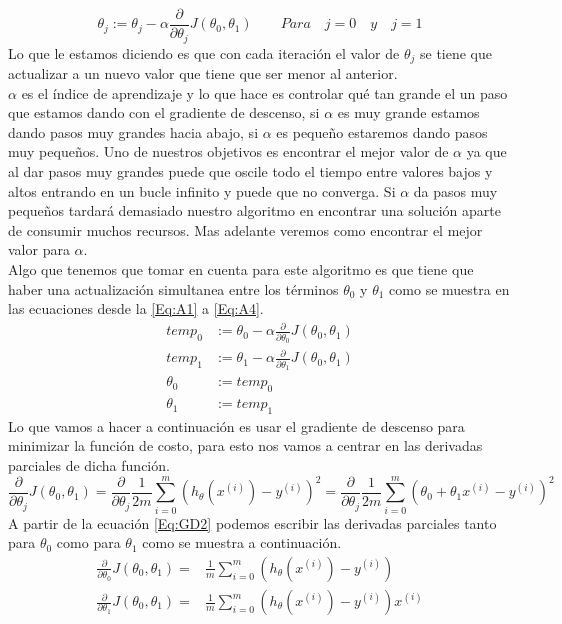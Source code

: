 \documentclass{book}
\begin{document}
\begin{equation}
	\theta_j := \theta_j -\alpha\frac{\partial}{\partial\theta_j}J(\theta_0,\theta_1)\qquad Para\quad j=0\quad y\quad j=1
	\label{Eq:DG}
\end{equation}
Lo que le estamos diciendo es que con cada iteración el valor de $\theta_j$ se tiene que actualizar a un nuevo valor que tiene que ser menor al anterior.\\$\alpha$ es el índice de aprendizaje y lo que hace es controlar qué tan grande el un paso que estamos dando con el gradiente de descenso, si $\alpha$ es muy grande estamos dando pasos muy grandes hacia abajo, si $\alpha$ es pequeño estaremos dando pasos muy pequeños. Uno de nuestros objetivos es encontrar el mejor valor de $\alpha$ ya que al dar pasos muy grandes puede que oscile todo el tiempo entre valores bajos y altos entrando en un bucle infinito y puede que no converga. Si $\alpha$ da pasos muy pequeños tardará demasiado nuestro algoritmo en encontrar una solución aparte de consumir muchos recursos. Mas adelante veremos como encontrar el mejor valor para $\alpha$.\\Algo que tenemos que tomar en cuenta para este algoritmo es que tiene que haber una actualización simultanea entre los términos $\theta_0$ y $\theta_1$ como se muestra en las ecuaciones desde la \ref{Eq:A1} a \ref{Eq:A4}.
\begin{align}
	temp_0&:= \theta_0 -\alpha\frac{\partial}{\partial\theta_0}J(\theta_0,\theta_1)\label{Eq:A1}\\
	temp_1&:= \theta_1 -\alpha\frac{\partial}{\partial\theta_1}J(\theta_0,\theta_1)\label{Eq:A2}\\
	\theta_0&:=temp_0\label{Eq:A3}\\
	\theta_1&:=temp_1\label{Eq:A4}
\end{align}
Lo que vamos a hacer a continuación es usar el gradiente de descenso para minimizar la función de costo, para esto nos vamos a centrar en las derivadas parciales de dicha función.
\begin{equation}
	\frac{\partial}{\partial\theta_j}J(\theta_0, \theta_1)=\frac{\partial}{\partial\theta_j}\frac{1}{2m}\sum_{i=0}^{m}(h_\theta(x^{(i)})-y^{(i)})^2=\frac{\partial}{\partial\theta_j}\frac{1}{2m}\sum_{i=0}^{m}(\theta_0+\theta_1x^{(i)}-y^{(i)})^2
	\label{Eq:GD2}
\end{equation}
A partir de la ecuación \ref{Eq:GD2} podemos escribir las derivadas parciales tanto para $\theta_0$ como para $\theta_1$ como se muestra a continuación.
\begin{align}
	\frac{\partial}{\partial\theta_0}J(\theta_0, \theta_1)=&\frac{1}{m}\sum_{i=0}^{m}(h_\theta(x^{(i)})-y^{(i)})\label{Eq:AI1}\\
	\frac{\partial}{\partial\theta_1}J(\theta_0, \theta_1)=&\frac{1}{m}\sum_{i=0}^{m}(h_\theta(x^{(i)})-y^{(i)})x^{(i)}\label{Eq:AI2}
\end{align}
\end{document}
